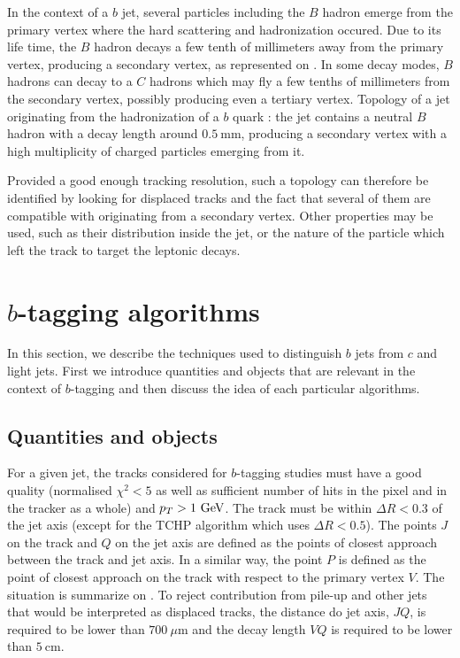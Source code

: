     In the context of a $b$ jet, several particles including the $B$ hadron emerge from
    the primary vertex where the hard scattering and hadronization occured. Due to its
    life time, the $B$ hadron decays a few tenth of millimeters away from the primary
    vertex, producing a secondary vertex, as represented on .
    In some decay modes, $B$ hadrons can decay to a $C$ hadrons which may fly a few tenths
    of millimeters from the secondary vertex, possibly producing even a tertiary vertex.
                 {Topology of a jet originating from the hadronization of a $b$ quark : the
                 jet contains a neutral $B$ hadron with a decay length around $0.5~\text{mm}$,
                 producing a secondary vertex with a high multiplicity of charged particles
                 emerging from it.}

    Provided a good enough tracking resolution, such a topology can therefore be identified
    by looking for displaced tracks and the fact that several of them are compatible with
    originating from a secondary vertex. Other properties may be used, such as their
    distribution inside the jet, or the nature of the particle which left the track to target
    the leptonic decays.

    \section{$b$-tagging algorithms \label{sec:bTagAlgorithms}}

    In this section, we describe the techniques used to distinguish $b$ jets from $c$ and
    light jets. First we introduce quantities and objects that are relevant in the context
    of $b$-tagging and then discuss the idea of each particular algorithms.

    \subsection{Quantities and objects}

    For a given jet, the tracks considered for $b$-tagging studies must have
    a good quality (normalised $\chi^2 < 5$ as well as sufficient number of hits in the
    pixel and in the tracker as a whole) and $p_T > 1~\text{GeV}$. The track must be within
    $\Delta R < 0.3$ of the jet axis (except for the TCHP algorithm which uses $\Delta R < 0.5$).
    The points $J$ on the track and $Q$ on the jet axis are defined as the points of closest
    approach between the track and jet axis. In a similar way, the point $P$ is defined
    as the point of closest approach on the track with respect to the primary vertex $V$.
    The situation is summarize on . To reject
    contribution from pile-up and other jets that would be interpreted as displaced
    tracks, the distance do jet axis, $JQ$, is required to be lower than $700~{\mu\text{m}}$
    and the decay length $VQ$ is required to be lower than $5~\text{cm}$.

